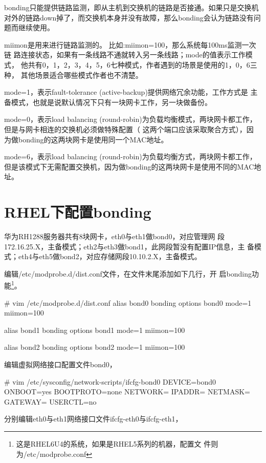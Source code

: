 bonding只能提供链路监测，即从主机到交换机的链路是否接通。如果只是交换机
对外的链路down掉了，而交换机本身并没有故障，那么bonding会认为链路没有问
题而继续使用。
 
miimon是用来进行链路监测的。 比如:miimon=100，那么系统每100ms监测一次链
路连接状态，如果有一条线路不通就转入另一条线路；mode的值表示工作模式，
他共有0，1，2，3，4，5，6七种模式，作者遇到的场景是使用的1，0，6三种，
其他场景适合哪些模式作者也不清楚。
 
mode=1，表示fault-tolerance (active-backup)提供网络冗余功能，工作方式是
主备模式，也就是说默认情况下只有一块网卡工作，另一块做备份。
 
mode=0，表示load balancing (round-robin)为负载均衡模式，两块网卡都工作，
但是与网卡相连的交换机必须做特殊配置（ 这两个端口应该采取聚合方式），因
为做bonding的这两块网卡是使用同一个MAC地址。
 
mode=6，表示load balancing (round-robin)为负载均衡方式，两块网卡都工作，
但是该模式下无需配置交换机，因为做bonding的这两块网卡是使用不同的MAC地
址。
 
\section{RHEL下配置bonding}

华为RH1288服务器共有8块网卡，eth0与eth1做bond0，对应管理网
段172.16.25.X，主备模式；eth2与eth3做bond1，此网段暂没有配置IP信息，主
备模式；eth4与eth5做bond2，对应存储网段10.10.2.X，主备模式。

编辑/etc/modprobe.d/dist.conf文件，在文件末尾添加如下几行，开
启bonding功能\footnote{这是RHEL6U4的系统，如果是RHEL5系列的机器，配置文
  件则为/etc/modprobe.conf}。

\begin{code}
# vim /etc/modprobe.d/dist.conf
alias bond0 bonding
options bond0 mode=1 miimon=100

alias bond1 bonding
options bond1 mode=1 miimon=100

alias bond2 bonding
options bond2 mode=1 miimon=100
\end{code}

编辑虚拟网络接口配置文件bond0，

\begin{code}
# vim /etc/sysconfig/network-scripts/ifcfg-bond0
DEVICE=bond0
ONBOOT=yes
BOOTPROTO=none
NETWORK=
IPADDR=
NETMASK=
GATEWAY=
USERCTL=no
\end{code}

分别编辑eth0与eth1网络接口文件ifcfg-eth0与ifcfg-eth1，

